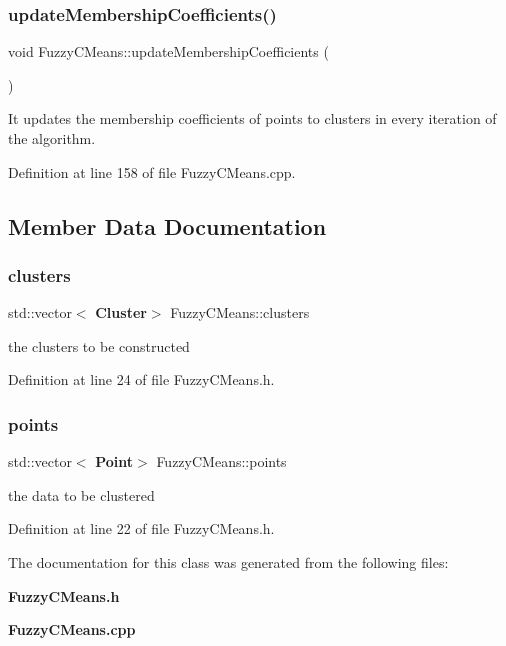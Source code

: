 \mbox{\label{class_fuzzy_c_means_a80c4f0bfed3da5b0e0f910085d826727}} 
\subsubsection{update\+Membership\+Coefficients()}
{\footnotesize\ttfamily void Fuzzy\+C\+Means\+::update\+Membership\+Coefficients (\begin{DoxyParamCaption}{ }\end{DoxyParamCaption})}

It updates the membership coefficients of points to clusters in every iteration of the algorithm. 

Definition at line 158 of file Fuzzy\+C\+Means.\+cpp.



\subsection{Member Data Documentation}
\mbox{\label{class_fuzzy_c_means_a3d3b7598064323842312bdc7845540cd}} 
\subsubsection{clusters}
{\footnotesize\ttfamily std\+::vector$<$\textbf{ Cluster}$>$ Fuzzy\+C\+Means\+::clusters}

the clusters to be constructed 

Definition at line 24 of file Fuzzy\+C\+Means.\+h.

\mbox{\label{class_fuzzy_c_means_ab75d3a803819d861585ff2d0fea218fa}} 
\subsubsection{points}
{\footnotesize\ttfamily std\+::vector$<$\textbf{ Point}$>$ Fuzzy\+C\+Means\+::points}

the data to be clustered 

Definition at line 22 of file Fuzzy\+C\+Means.\+h.



The documentation for this class was generated from the following files\+:\begin{DoxyCompactItemize}
\item 
\textbf{ Fuzzy\+C\+Means.\+h}\item 
\textbf{ Fuzzy\+C\+Means.\+cpp}\end{DoxyCompactItemize}
